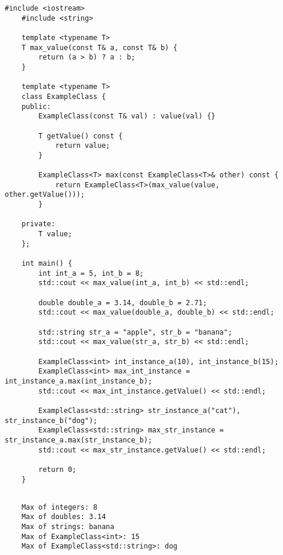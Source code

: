\documentclass[fleqn, a4paper. 12pt]{ltjsarticle} %
\begin{document}
\begin{lstlisting}[caption=kadai4, label=program4]
    #include <iostream>
    #include <string>
    
    template <typename T>
    T max_value(const T& a, const T& b) {
        return (a > b) ? a : b;
    }
    
    template <typename T>
    class ExampleClass {
    public:
        ExampleClass(const T& val) : value(val) {}
    
        T getValue() const {
            return value;
        }
    
        ExampleClass<T> max(const ExampleClass<T>& other) const {
            return ExampleClass<T>(max_value(value, other.getValue()));
        }
    
    private:
        T value;
    };
    
    int main() {
        int int_a = 5, int_b = 8;
        std::cout << max_value(int_a, int_b) << std::endl;
    
        double double_a = 3.14, double_b = 2.71;
        std::cout << max_value(double_a, double_b) << std::endl;
    
        std::string str_a = "apple", str_b = "banana";
        std::cout << max_value(str_a, str_b) << std::endl;
    
        ExampleClass<int> int_instance_a(10), int_instance_b(15);
        ExampleClass<int> max_int_instance = int_instance_a.max(int_instance_b);
        std::cout << max_int_instance.getValue() << std::endl;
    
        ExampleClass<std::string> str_instance_a("cat"), str_instance_b("dog");
        ExampleClass<std::string> max_str_instance = str_instance_a.max(str_instance_b);
        std::cout << max_str_instance.getValue() << std::endl;
    
        return 0;
    }
    
\end{lstlisting}

\begin{screen}
\begin{verbatim}
    Max of integers: 8
    Max of doubles: 3.14
    Max of strings: banana
    Max of ExampleClass<int>: 15
    Max of ExampleClass<std::string>: dog
\end{verbatim}
\end{screen}
\end{document}
